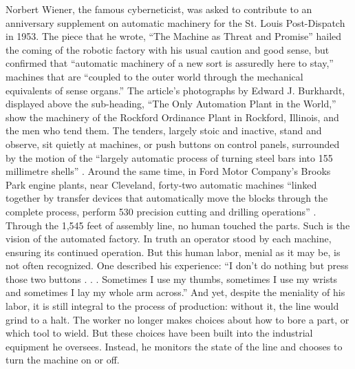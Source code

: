 Norbert Wiener, the famous cyberneticist, was asked to contribute to an
anniversary supplement on automatic machinery for the St. Louis
Post-Dispatch in 1953. The piece that he wrote, ``The Machine as Threat
and Promise'' \cite{wienerMachineThreat} hailed the coming of the
robotic factory with his usual 
caution and good sense, but confirmed that ``automatic machinery of a
new sort is assuredly here to stay,'' machines that are ``coupled to the
outer world through the mechanical equivalents of sense organs.'' The
article's photographs by Edward J. Burkhardt, displayed above the
sub-heading, ``The Only Automation Plant in the World,'' show the
machinery of the Rockford Ordinance Plant in Rockford, Illinois, and
the men who tend them. The tenders, largely stoic and inactive, stand
and observe, sit quietly at machines, or push buttons on control
panels, surrounded by the motion of the ``largely automatic process of
turning steel bars into 155 millimetre
shells'' \cite{wienerMachineThreat}. Around the same time, in Ford
Motor Company's Brooks Park engine plants, near Cleveland, forty-two
automatic machines ``linked together by transfer devices that
automatically move the blocks through the complete process, perform
530 precision cutting and drilling operations'' \cite[p.
  9]{dieboldImpact}. Through the 1,545 feet of assembly line, no human
touched the parts. Such is the vision of the automated factory. In
truth an operator stood by each machine, ensuring its continued
operation. But this human labor, menial as it may be, is not often
recognized. One described his experience: ``I don't do nothing but
press those two buttons . . . Sometimes I use my thumbs, sometimes I
use my wrists and sometimes I lay my whole arm across.''\cite[p.
  10]{dieboldImpact} And yet,
despite the meniality of his labor, it is still integral to the
process of production: without it, the line would grind to a halt. The worker
no longer makes choices about how to bore a part, or which tool to
wield. But these choices have been built into the industrial equipment
he oversees. Instead, he monitors the state of the line and chooses to
turn the machine on or off.

